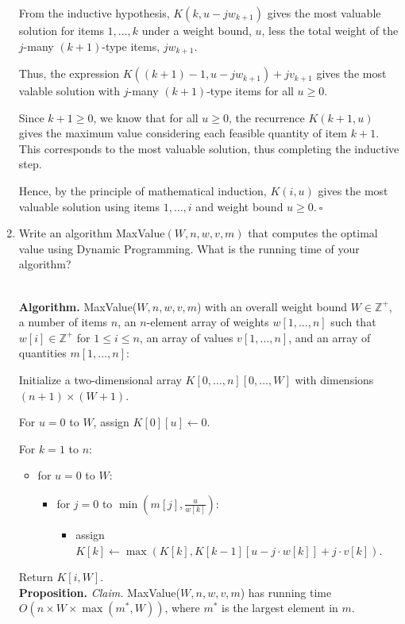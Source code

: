 \begin{enumerate}
\begin{solution}
From the inductive hypothesis, $K(k,u-jw_{k+1})$ gives the most valuable solution for items $1,\dots,k$ under a weight bound, $u$, less the total weight of the $j$-many $(k+1)$-type items, $jw_{k+1}$.

Thus, the expression $K((k+1)-1,u-jw_{k+1})+jv_{k+1}$ gives the most valable solution with $j$-many $(k+1)$-type items for all $u\geq 0$.

Since $k+1\geq 0$, we know that for all $u\geq 0$, the recurrence $K(k+1,u)$ gives the maximum value considering each feasible quantity of item $k+1$. This corresponds to the most valuable solution, thus completing the inductive step.

Hence, by the principle of mathematical induction, $K(i,u)$ gives the most valuable solution using items $1,\dots,i$ and weight bound $u\geq 0$.$~\square$
\end{solution}
\item Write an algorithm {\sc MaxValue}$(W,n,w,v,m)$ that computes the optimal value using Dynamic Programming. What is the running time of your algorithm?
\begin{solution}\\

\textbf{Algorithm. }{\sc MaxValue}($W,n,w,v,m$) with an overall weight bound $W\in\mathbb{Z}^+$, a number of items $n$, an $n$-element array of weights $w[1,\dots,n]$ such that $w[i]\in\mathbb{Z}^+$ for $1\leq i\leq n$, an array of values $v[1,\dots,n]$, and an array of quantities $m[1,\dots,n]$:

Initialize a two-dimensional array $K[0,\dots,n][0,\dots,W]$ with dimensions $(n+1)\times(W+1)$.

For $u=0$ to $W$, assign $K[0][u]\leftarrow 0$.

For $k=1$ to $n$:
\begin{itemize}
\item for $u=0$ to $W$:
\begin{itemize}
\item for $j=0$ to $\min\left(m[j],\frac{u}{w[k]}\right)$:
\begin{itemize}
\item assign $K[k]\leftarrow\max(K[k],K[k-1][u-j\cdot w[k]]+j\cdot v[k])$.
\end{itemize}
\end{itemize}
\end{itemize}
Return $K[i,W]$.\\

\textbf{Proposition. }\textit{Claim. }{\sc MaxValue}($W,n,w,v,m$) has running time $O(n\times W\times\max(m^*,W))$, where $m^*$ is the largest element in $m$.


\end{solution}
\end{enumerate}
